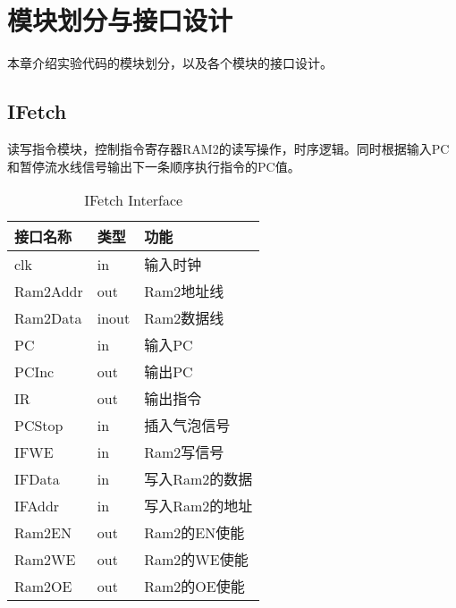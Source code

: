 
\chapter{模块划分与接口设计} %

\label{Chapter4} %
本章介绍实验代码的模块划分，以及各个模块的接口设计。


\section{IFetch}
读写指令模块，控制指令寄存器RAM2的读写操作，时序逻辑。同时根据输入PC和暂停流水线信号输出下一条顺序执行指令的PC值。

\begin{center}
\renewcommand{\arraystretch}{1.3}
\small
\begin{longtable}{|p{3cm}<{\centering}|p{1.4cm}<{\centering}|p{7cm}<{\centering}|}
\caption{IFetch Interface}
\label{tab:treatments}\\
\hline
接口名称 & 类型 & 功能 \\\hline
clk & in & 输入时钟 \\\hline
Ram2Addr & out & Ram2地址线\\\hline
Ram2Data & inout &  Ram2数据线\\\hline
PC & in & 输入PC \\\hline
PCInc & out & 输出PC \\\hline
IR & out & 输出指令 \\\hline
PCStop & in & 插入气泡信号\\\hline
IFWE & in & Ram2写信号\\\hline
IFData & in &  写入Ram2的数据 \\\hline
IFAddr & in & 写入Ram2的地址\\\hline
Ram2EN & out & Ram2的EN使能\\\hline
Ram2WE & out & Ram2的WE使能\\\hline
Ram2OE & out & Ram2的OE使能\\\hline
\end{longtable}
\end{center}


